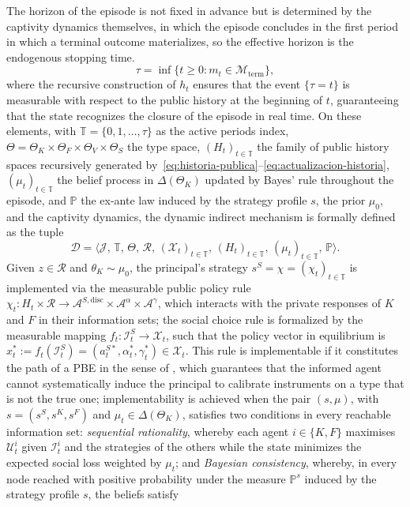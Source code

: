 \documentclass[pdflatex,sn-mathphys-ay]{sn-jnl}
\theoremstyle{plain}
\theoremstyle{definition}
\newcommand{\Prob}{\mathbb{P}}
\newcommand{\ThetaK}{\Theta_K}
\newcommand{\1}{\mathbf{1}}
\begin{document}
The horizon of the episode is not fixed in advance but is determined by the captivity dynamics themselves, in which the episode concludes in the first period in which a terminal outcome materializes, so the effective horizon is the endogenous stopping time.
\begin{equation}
\tau=\inf\{t\geq 0:m_t\in\mathcal{M}_{\mathrm{term}}\},\label{eq:stopping-time}
\end{equation}
where the recursive construction of $h_t$ ensures that the event $\{\tau=t\}$ is measurable with respect to the public history at the beginning of $t$, guaranteeing that the state recognizes the closure of the episode in real time. On these elements, with $\mathbb{T}=\{0,1,\ldots,\tau\}$ as the active periods index, $\Theta=\ThetaK\times\Theta_F\times\Theta_V\times\Theta_S$ the type space, $(H_t)_{t\in\mathbb{T}}$ the family of public history spaces recursively generated by~\eqref{eq:historia-publica}--\eqref{eq:actualizacion-historia}, $(\mu_t)_{t\in\mathbb{T}}$ the belief process in $\Delta(\ThetaK)$ updated by Bayes' rule throughout the episode, and $\Prob$ the ex-ante law induced by the strategy profile $s$, the prior $\mu_0$, and the captivity dynamics, the dynamic indirect mechanism is formally defined as the tuple
\[
\mathcal{D}=\bigl\langle\mathcal{J},\,\mathbb{T},\,\Theta,\,\mathcal{R},\,(\mathcal{X}_t)_{t\in\mathbb{T}},\,(H_t)_{t\in\mathbb{T}},\,(\mu_t)_{t\in\mathbb{T}},\,\Prob\bigr\rangle.
\]
Given $z\in\mathcal{R}$ and $\theta_K\sim\mu_0$, the principal's strategy $s^S=\chi=(\chi_t)_{t\in\mathbb{T}}$ is implemented via the measurable public policy rule $\chi_t\colon H_t\times\mathcal{R}\to\mathcal{A}^{S,\mathrm{disc}}\times\mathcal{A}^{\alpha}\times\mathcal{A}^{\gamma}$, which interacts with the private responses of $K$ and $F$ in their information sets; the social choice rule is formalized by the measurable mapping $f_t\colon\mathcal{I}_t^S\to\mathcal{X}_t$, such that the policy vector in equilibrium is $x_t^\ast:=f_t(\mathcal{I}_t^S)=(a_t^{S\ast},\alpha_t^\ast,\gamma_t^\ast)\in\mathcal{X}_t$. This rule is implementable if it constitutes the path of a PBE in the sense of \citet{FudenbergTirole1991}, which guarantees that the informed agent cannot systematically induce the principal to calibrate instruments on a type that is not the true one; implementability is achieved when the pair $(s,\mu)$, with $s=(s^S,s^K,s^F)$ and $\mu_t\in\Delta(\ThetaK)$, satisfies two conditions in every reachable information set: \emph{sequential rationality}, whereby each agent $i\in\{K,F\}$ maximises $\mathcal{U}_t^i$ given $\mathcal{I}_t^i$ and the strategies of the others while the state minimizes the expected social loss weighted by $\mu_t$; and \emph{Bayesian consistency}, whereby, in every node reached with positive probability under the measure $\Prob^s$ induced by the strategy profile $s$, the beliefs satisfy
\end{document}

